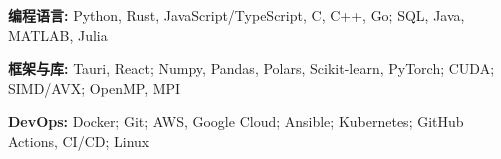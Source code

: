 \begin{enumerate}[label={[\arabic*]},nosep]
  \item \textbf{编程语言:} Python, Rust, JavaScript/TypeScript, C, C++, Go; SQL, Java, MATLAB, Julia
  \item \textbf{框架与库:} Tauri, React; Numpy, Pandas, Polars, Scikit-learn, PyTorch; CUDA; SIMD/AVX; OpenMP, MPI
  \item \textbf{DevOps:} Docker; Git; AWS, Google Cloud; Ansible; Kubernetes; GitHub Actions, CI/CD; Linux
\end{enumerate}

